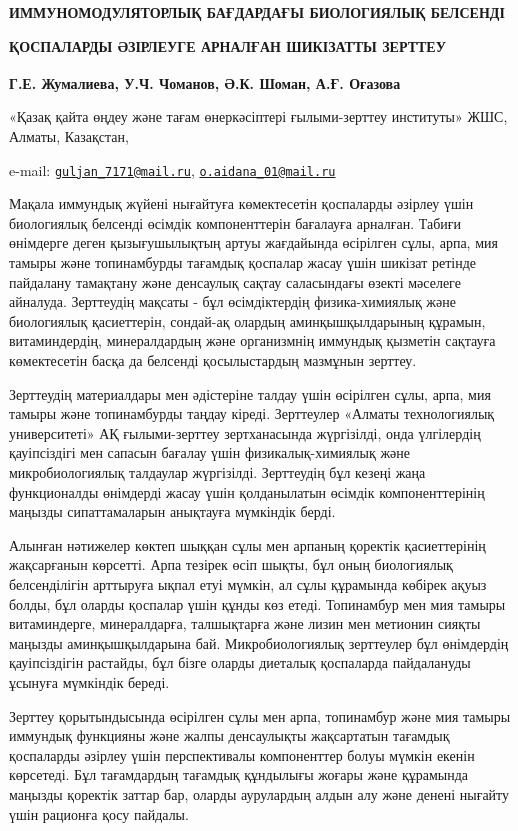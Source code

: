 {\bfseries ИММУНОМОДУЛЯТОРЛЫҚ БАҒДАРДАҒЫ БИОЛОГИЯЛЫҚ БЕЛСЕНДІ}

{\bfseries ҚОСПАЛАРДЫ ӘЗІРЛЕУГЕ АРНАЛҒАН ШИКІЗАТТЫ ЗЕРТТЕУ}

{\bfseries Г.Е. Жумалиева\textsuperscript{\envelope }, У.Ч. Чоманов, Ә.К. Шоман,
А.Ғ. Оғазова\textsuperscript{\envelope }}

«Қазақ қайта өңдеу және тағам өнеркәсіптері ғылыми-зерттеу институты»
ЖШС, Алматы, Казақстан,

e-mail:
\href{mailto:guljan_7171@mail.ru}{\nolinkurl{guljan\_7171@mail.ru}},
\href{mailto:o.aidana_01@mail.ru}{\nolinkurl{o.aidana\_01@mail.ru}}

Мақала иммундық жүйені нығайтуға көмектесетін қоспаларды әзірлеу үшін
биологиялық белсенді өсімдік компоненттерін бағалауға арналған. Табиғи
өнімдерге деген қызығушылықтың артуы жағдайында өсірілген сұлы, арпа,
мия тамыры және топинамбурды тағамдық қоспалар жасау үшін шикізат
ретінде пайдалану тамақтану және денсаулық сақтау саласындағы өзекті
мәселеге айналуда. Зерттеудің мақсаты - бұл өсімдіктердің
физика-химиялық және биологиялық қасиеттерін, сондай-ақ олардың
аминқышқылдарының құрамын, витаминдердің, минералдардың және организмнің
иммундық қызметін сақтауға көмектесетін басқа да белсенді қосылыстардың
мазмұнын зерттеу.

Зерттеудің материалдары мен әдістеріне талдау үшін өсірілген сұлы, арпа,
мия тамыры және топинамбурды таңдау кіреді. Зерттеулер «Алматы
технологиялық университеті» АҚ ғылыми-зерттеу зертханасында жүргізілді,
онда үлгілердің қауіпсіздігі мен сапасын бағалау үшін физикалық-химиялық
және микробиологиялық талдаулар жүргізілді. Зерттеудің бұл кезеңі жаңа
функционалды өнімдерді жасау үшін қолданылатын өсімдік компоненттерінің
маңызды сипаттамаларын анықтауға мүмкіндік берді.

Алынған нәтижелер көктеп шыққан сұлы мен арпаның қоректік қасиеттерінің
жақсарғанын көрсетті. Арпа тезірек өсіп шықты, бұл оның биологиялық
белсенділігін арттыруға ықпал етуі мүмкін, ал сұлы құрамында көбірек
ақуыз болды, бұл оларды қоспалар үшін құнды көз етеді. Топинамбур мен
мия тамыры витаминдерге, минералдарға, талшықтарға және лизин мен
метионин сияқты маңызды аминқышқылдарына бай. Микробиологиялық
зерттеулер бұл өнімдердің қауіпсіздігін растайды, бұл бізге оларды
диеталық қоспаларда пайдалануды ұсынуға мүмкіндік береді.

Зерттеу қорытындысында өсірілген сұлы мен арпа, топинамбур және мия
тамыры иммундық функцияны және жалпы денсаулықты жақсартатын тағамдық
қоспаларды әзірлеу үшін перспективалы компоненттер болуы мүмкін екенін
көрсетеді. Бұл тағамдардың тағамдық құндылығы жоғары және құрамында
маңызды қоректік заттар бар, оларды аурулардың алдын алу және денені
нығайту үшін рационға қосу пайдалы.

